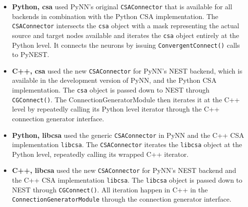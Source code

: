 \documentclass{frontiersSCNS} %
\begin{document}
\begin{itemize}
\item \textbf{Python, csa} used PyNN's original \verb|CSAConnector|
  that is available for all backends in combination with the Python
  CSA implementation. The \verb|CSAConnector| intersects the
  \verb|csa| object with a mask representing the actual source and
  target nodes available and iterates the \verb|csa| object entirely
  at the Python level. It connects the neurons by issuing
  \verb|ConvergentConnect()| calls to PyNEST.
\item \textbf{C++, csa} used the new \verb|CSAConnector| for PyNN's
  NEST backend, which is available in the development version of PyNN,
  and the Python CSA implementation. The \verb|csa| object is passed
  down to NEST through \verb|CGConnect()|. The
  ConnectionGeneratorModule then iterates it at the C++ level by
  repeatedly calling its Python level iterator through the C++
  connection generator interface.
\item \textbf{Python, libcsa} used the generic \verb|CSAConnector| in
  PyNN and the C++ CSA implementation \verb|libcsa|. The
  \verb|CSAConnector| iterates the \verb|libcsa| object at the Python
  level, repeatedly calling its wrapped C++ iterator.
\item \textbf{C++, libcsa} used the new \verb|CSAConnector| for PyNN's
  NEST backend and the C++ CSA implementation \verb|libcsa|. The
  \verb|libcsa| object is passed down to NEST through
  \verb|CGConnect()|. All iteration happen in C++ in the
  \verb|ConnectionGeneratorModule| through the connection generator
  interface.
\end{itemize}
\end{document}
